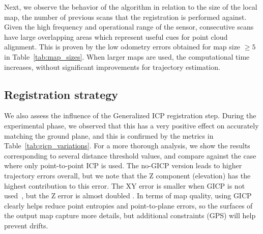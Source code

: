 Next, we observe the behavior of the algorithm in relation to the size of the local map, \ie the number of previous scans that the registration is performed against. Given the high frequency and operational range of the sensor, consecutive scans have large overlapping areas which represent useful cues for point cloud alignment. This is proven by the low odometry errors obtained for map size $\geq 5$ in Table~\ref{tab:map_sizes}. When larger maps are used, the computational time increases, without significant improvements for trajectory estimation.
\subsection{Registration strategy}

We also assess the influence of the Generalized ICP registration step. During the experimental phase, we observed that this has a very positive effect on accurately matching the ground plane, and this is confirmed by the metrics in Table~\ref{tab:gicp_variations}. For a more thorough analysis, we show the results corresponding to several distance threshold values, and compare against the case where only point-to-point ICP is used. The no-GICP version leads to higher trajectory errors overall, but we note that the Z component (elevation) has the highest contribution to this error. The XY error is smaller when GICP is not used~, but the Z error is almost doubled . In terms of map quality, using GICP clearly helps reduce point entropies and point-to-plane errors, so the surfaces of the output map capture more details, but additional constraints (\ie GPS) will help prevent drifts.

